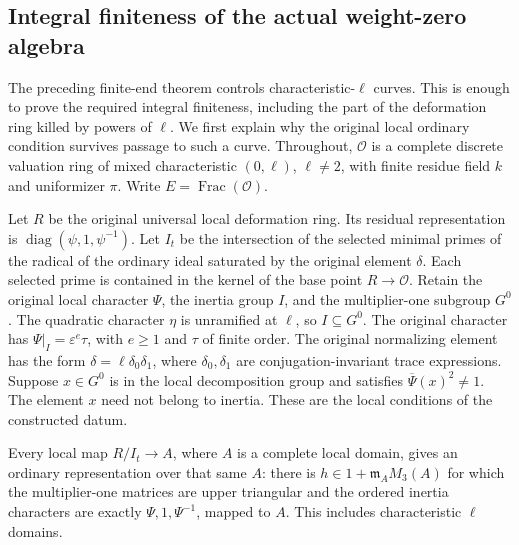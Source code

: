 \subsection{Integral finiteness of the actual weight-zero algebra}
\label{sec:support-integral-finiteness}

The preceding finite-end theorem controls characteristic-$\ell$ curves.
This is enough to prove the required integral finiteness, including the
part of the deformation ring killed by powers of $\ell$.  We first
explain why the original local ordinary condition survives passage to
such a curve.  Throughout, $\mathcal O$ is a complete discrete valuation
ring of mixed characteristic $(0,\ell)$, $\ell\ne2$, with finite residue
field $k$ and uniformizer $\pi$.  Write $E=\operatorname{Frac}(\mathcal O)$.

\begin{lemma}
\label{lem:support-integral-ordinary-flag}
Let $R$ be the original universal local deformation ring.  Its residual
representation is $\operatorname{diag}(\psi,1,\psi^{-1})$.  Let $I_t$ be
the intersection of the selected minimal primes of the radical of the
ordinary ideal saturated by the original element $\delta$.  Each selected
prime is contained in the kernel of the base point $R\to\mathcal O$.
Retain the original local character $\Psi$, the inertia group $I$, and
the multiplier-one subgroup $G^0$.  The quadratic character $\eta$
is unramified at $\ell$, so $I\subseteq G^0$.  The original character has $\Psi|_I=\varepsilon^e\tau$, with
$e\ge1$ and $\tau$ of finite order.  The original normalizing
element has the form $\delta=\ell\delta_0\delta_1$, where
$\delta_0,\delta_1$ are conjugation-invariant trace expressions.
Suppose $x\in G^0$ is in the local decomposition group and satisfies
$\overline\Psi(x)^2\ne1$.  The element $x$ need not belong to inertia.
These are the local conditions of the constructed datum\cite{integral-finiteness-source}.

Every local map $R/I_t\to A$, where $A$ is a complete local domain,
gives an ordinary representation over that same $A$: there is
$h\in1+\mathfrak m_A M_3(A)$ for which the multiplier-one matrices
are upper triangular and the ordered inertia characters are exactly
$\Psi,1,\Psi^{-1}$, mapped to $A$.  This includes characteristic
$\ell$ domains.
\end{lemma}

